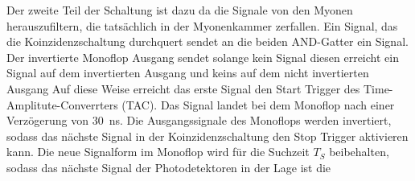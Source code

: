 Der zweite Teil der Schaltung ist dazu da die Signale von den Myonen herauszufiltern, die tatsächlich
in der Myonenkammer zerfallen. Ein Signal, das die Koinzidenzschaltung durchquert
sendet an die beiden AND-Gatter ein Signal. Der invertierte Monoflop Ausgang sendet solange kein
Signal diesen erreicht ein Signal auf dem invertierten Ausgang und keins auf dem nicht invertierten Ausgang
Auf diese Weise erreicht das erste Signal den Start Trigger des Time-Amplitute-Converrters (TAC).
Das Signal landet bei dem Monoflop nach einer Verzögerung von \qty{30}{\ns}. 
Die Ausgangssignale des Monoflops werden invertiert, sodass das nächste Signal in der 
Koinzidenzschaltung den Stop Trigger aktivieren kann.
Die neue Signalform im Monoflop wird für die Suchzeit $T_S$ beibehalten, sodass das nächste Signal der 
Photodetektoren in der Lage ist die 


